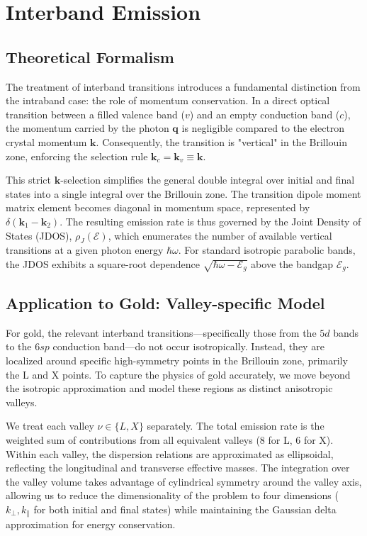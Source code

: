 \section{Interband Emission}

\subsection{Theoretical Formalism}
The treatment of interband transitions introduces a fundamental distinction from the intraband case: the role of momentum conservation. In a direct optical transition between a filled valence band ($v$) and an empty conduction band ($c$), the momentum carried by the photon $\mathbf{q}$ is negligible compared to the electron crystal momentum $\mathbf{k}$. Consequently, the transition is "vertical" in the Brillouin zone, enforcing the selection rule $\mathbf{k}_c = \mathbf{k}_v \equiv \mathbf{k}$.

This strict $\mathbf{k}$-selection simplifies the general double integral over initial and final states into a single integral over the Brillouin zone. The transition dipole moment matrix element becomes diagonal in momentum space, represented by $\delta(\mathbf{k}_1 - \mathbf{k}_2)$. The resulting emission rate is thus governed by the Joint Density of States (JDOS), $\rho_J(\mathcal{E})$, which enumerates the number of available vertical transitions at a given photon energy $\hbar\omega$. For standard isotropic parabolic bands, the JDOS exhibits a square-root dependence $\sqrt{\hbar\omega - \mathcal{E}_g}$ above the bandgap $\mathcal{E}_g$.

\subsection{Application to Gold: Valley-specific Model}
For gold, the relevant interband transitions—specifically those from the $5d$ bands to the $6sp$ conduction band—do not occur isotropically. Instead, they are localized around specific high-symmetry points in the Brillouin zone, primarily the L and X points. To capture the physics of gold accurately, we move beyond the isotropic approximation and model these regions as distinct anisotropic valleys.

We treat each valley $\nu \in \{L, X\}$ separately. The total emission rate is the weighted sum of contributions from all equivalent valleys (8 for L, 6 for X). Within each valley, the dispersion relations are approximated as ellipsoidal, reflecting the longitudinal and transverse effective masses. The integration over the valley volume takes advantage of cylindrical symmetry around the valley axis, allowing us to reduce the dimensionality of the problem to four dimensions ($k_{\perp}, k_{\parallel}$ for both initial and final states) while maintaining the Gaussian delta approximation for energy conservation.

